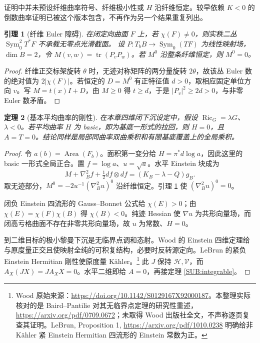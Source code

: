 \documentclass[UTF8,fontset=fandol,zihao=-4,oneside,openany]{ctexbook}
\theoremstyle{cjkplain}
\newtheorem{theorem}{定理}[chapter]
\newtheorem{lemma}[theorem]{引理}
\numberwithin{equation}{chapter}
\begin{document}
证明中并未预设纤维曲率符号、纤维极小性或 $H$ 沿纤维恒定。较早依赖 $K<0$ 的倒数曲率证明已被这个版本包含，不再作为另一个结果重复列出。

\begin{lemma}[纤维 Euler 障碍]\label{SUB:euler}
在闭定向曲面 $F$ 上，若 $\chi(F)\ne0$，则实秩二丛
$\operatorname{Sym}_0^2T^*F$ 不承载无零点光滑截面。
设 $P:T_bB\to\operatorname{Sym}_0(TF)$ 为线性映射场，$\dim B=2$，令 $M(v,w)=\operatorname{tr}(P_vP_w)$。若 $M^0$ 沿整条纤维恒定，则 $M^0=0$。
\end{lemma}
\begin{proof}
纤维正交标架旋转 $\theta$ 时，无迹对称矩阵的两分量旋转 $2\theta$，故该丛 Euler 数的绝对值为 $2|\chi(F)|$。若恒定的 $D=M^0$ 有正特征值 $d>0$，取相应固定单位方向 $v$。写 $M=t(x)I+D$，由 $M\ge0$ 得 $t\ge d$，于是 $|P_v|^2\ge2d>0$，与非零 Euler 数矛盾。
\end{proof}

\begin{theorem}[基本平均曲率的刚性]\label{SUB:basic}
在本章四维闭下沉设定中，假设 $\operatorname{Ric}_G=\lambda G$、$\lambda<0$。若平均曲率 $H$ 为 basic，即为基底一形式的拉回，则 $H=0$，且 $A=T=0$。结论同样是局部同曲率双曲乘积和有限基底覆盖上的全局乘积。
\end{theorem}
\begin{proof}
令 $a(b)=\operatorname{Area}(F_b)$。面积第一变分给 $H=\pi^*d\log a$，因此这里的 basic 一形式全局正合。置 $f=\log a$、$u=\sqrt a$。水平 Einstein 块成为
\[
M+\nabla_B^2f+\tfrac12df\otimes df=(K_B-\lambda-Q)g_B.
\]
取无迹部分，$M^0=-2u^{-1}(\nabla_B^2u)^0$ 沿纤维恒定。引理 \ref{SUB:euler} 使 $(\nabla_B^2u)^0=0$。

闭负 Einstein 四流形的 Gauss--Bonnet 公式给 $\chi(E)>0$；由
$\chi(E)=\chi(F)\chi(B)$ 得 $\chi(B)<0$。纯迹 Hessian 使 $\nabla u$ 为共形向量场，而闭高亏格曲面不存在非零共形向量场，故 $u$ 为常数、$H=0$。

到二维目标的极小黎曼下沉是无临界点调和态射。Wood 的 Einstein 四维定理给与原度量正交且使映射全纯的可积复结构，必要时反转源定向。LeBrun 的紧负 Einstein Hermitian 刚性使原度量 Kähler。\footnote{Wood 原始来源：\url{https://doi.org/10.1142/S0129167X92000187}。本整理实际核对的是 Baird--Pantilie 对其无临界点定理的研究性重述，\url{https://arxiv.org/pdf/0709.0672}；未取得 Wood 出版社全文，不声称逐页复查其证明。LeBrun, Proposition 1, \url{https://arxiv.org/pdf/1010.0238} 明确给非 Kähler 紧 Einstein Hermitian 四流形的 Einstein 常数为正。}
此 $J$ 保持 $\mathcal H,\mathcal V$，而
$A_X(JX)=J A_XX=0$。水平二维即给 $A=0$，再接定理 \ref{SUB:integrable}。
\end{proof}
\end{document}
